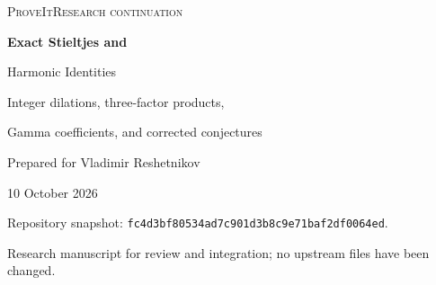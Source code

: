 \documentclass[11pt,a4paper]{article}
\numberwithin{equation}{section}
\theoremstyle{definition}
\begin{document}
\hypersetup{pageanchor=false}
\begin{titlepage}
\thispagestyle{empty}
\vspace*{13mm}
{\large\scshape ProveIt\quad Research continuation\par}
\vspace{17mm}
{\huge\bfseries Exact Stieltjes and\par Harmonic Identities\par}
\vspace{8mm}
{\Large Integer dilations, three-factor products,\par Gamma coefficients, and corrected conjectures\par}
\vspace{16mm}
{\large Prepared for Vladimir Reshetnikov\par}
\vspace{3mm}
{10 October 2026\par}
\vfill
\begin{abstract}
We develop exact identities extending the periodic Hurwitz--Stieltjes
calculus in the ProveIt manuscript and its incoming research reports.
For two affine integer frequencies we prove a complete reduction to the
unit-frequency shifted correlation, including every Stieltjes index and
the finite polynomial that records changes of local cutoff scale and
argument differentiation.  For three distinct translations we give a
six-term colored Tornheim formula, prove its entire kernel continuation,
and extract all finite-part Stieltjes products and ordinary correlations
of their normalized antiderivatives.  A separate Gamma-quotient calculus
reduces shifted elementary harmonic sums with arbitrary convergent rational
kernels to finite polygamma expressions and determines their complete
principal parts and constants at the moving spectral pole.  Gauss
summation supplies convergent series for every generalized Stieltjes
constant, all mixed parameter derivatives, and successive negative-integer
resonances.  Finally, one generating identity proves corrected versions
of two displayed harmonic conjecture families in a 2014 paper and
identifies the accompanying normalization and harmonic-order errors.
Every principal result has an analytic proof.  Exact symbolic generators,
independent numerical diagnostics, a source audit, and a prioritized
research agenda accompany the article.  Classical ingredients and results
already in the repository are explicitly distinguished from the present
extensions; historical priority is not asserted.
\end{abstract}
\vspace{9mm}
{\small Repository snapshot: \texttt{fc4d3bf80534ad7c901d3b8c9e71baf2df0064ed}.\par
Research manuscript for review and integration; no upstream files have been changed.\par}
\end{titlepage}
\end{document}
